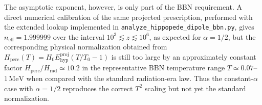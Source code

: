 \documentclass[3p,times,twocolumn]{elsarticle}
\begin{document}
The asymptotic exponent, however, is only part of the BBN requirement. A direct numerical calibration of the same projected prescription, performed with the extended lookup implemented in \texttt{analyze\_hippopede\_dipole\_bbn.py}, gives $n_{\mathrm{eff}}=1.999999$ over the interval $10^3\lesssim z\lesssim10^6$, as expected for $\alpha=1/2$, but the corresponding physical normalization obtained from $H_{\mathrm{perc}}(T)=H_0E_{\mathrm{hyp}}^{\mathrm{proj}}(T/T_0-1)$ is still too large by an approximately constant factor $H_{\mathrm{perc}}/H_{\mathrm{rad}}\simeq10.2$ in the representative BBN temperature range $T\simeq0.07$--$1\,\mathrm{MeV}$ when compared with the standard radiation-era law. Thus the constant-$\alpha$ case with $\alpha=1/2$ reproduces the correct $T^2$ scaling but not yet the standard normalization.
\end{document}
